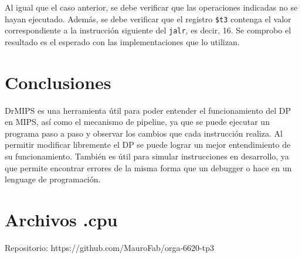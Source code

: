 \documentclass[11pt,a4paper, spanish]{article}
\begin{document}
Al igual que el caso anterior, se debe verificar que las operaciones indicadas no se hayan ejecutado.
Además, se debe verificar que el registro \texttt{\$t3} contenga el valor correspondiente a la instrucción siguiente del \texttt{jalr}, es decir, 16.
Se comprobo el resultado es el esperado con las implementaciones que lo utilizan.

\section{Conclusiones}

DrMIPS es una herramienta útil para poder entender el funcionamiento del DP en MIPS, así
como el mecanismo de pipeline, ya que se puede ejecutar un programa paso a paso y observar los cambios
que cada instrucción realiza. Al permitir modificar libremente el DP se puede lograr un mejor
entendimiento de su funcionamiento. También es útil para simular instrucciones en 
desarrollo, ya que permite encontrar errores de la misma forma que un debugger o hace
en un lenguage de programación.


\newpage

\section{Archivos .cpu}

Repositorio: https://github.com/MauroFab/orga-6620-tp3
\end{document}
